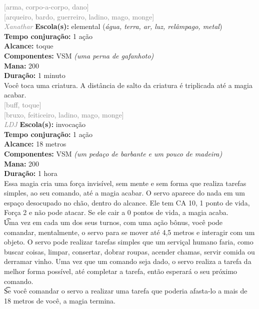 \documentclass{RPG_Adventure}[2021/10/20]
\begin{document}
{\scriptsize \textcolor{gray}{[arma, corpo-a-corpo, dano]\\}}
{\scriptsize \textcolor{gray}{[arqueiro, bardo, guerreiro, ladino, mago, monge]\\}}
{\tiny \textcolor{gray}{\textit{Xanathar}}}\jump{}
{\small \t \textbf{Escola(s):} elemental (\textit{água, terra, ar, luz, relâmpago, metal})\\\t \textbf{Tempo conjuração:} 1 ação\\\t \textbf{Alcance:} toque\\\t \textbf{Componentes:} VSM \textit{(uma perna de gafanhoto)}\\\t \textbf{Mana:} 200\\\t \textbf{Duração:} 1 minuto\\}
{\normalsize Você toca uma criatura. A distância de salto da criatura é triplicada até a magia acabar.\\}
{\scriptsize \textcolor{gray}{[buff, toque]\\}}
{\scriptsize \textcolor{gray}{[bruxo, feiticeiro, ladino, mago, monge]\\}}
{\tiny \textcolor{gray}{\textit{LDJ}}}\jump{}
{\small \t \textbf{Escola(s):} invocação\\\t \textbf{Tempo conjuração:} 1 ação\\\t \textbf{Alcance:} 18 metros\\\t \textbf{Componentes:} VSM \textit{(um pedaço de barbante e um pouco de madeira)}\\\t \textbf{Mana:} 200\\\t \textbf{Duração:} 1 hora\\}
{\normalsize Essa magia cria uma força invisível, sem mente e sem forma que realiza tarefas simples, ao seu comando, até a magia acabar. O servo aparece do nada em um espaço desocupado no chão, dentro do alcance. Ele tem CA 10, 1 ponto de vida, Força 2 e não pode atacar. Se ele cair a 0 pontos de vida, a magia acaba.\\\t Uma vez em cada um dos seus turnos, com uma ação bônus, você pode comandar, mentalmente, o servo para se mover até 4,5 metros e interagir com um objeto. O servo pode realizar tarefas simples que um serviçal humano faria, como buscar coisas, limpar, consertar, dobrar roupas, acender chamas, servir comida ou derramar vinho. Uma vez que um comando seja dado, o servo realiza a tarefa da melhor forma possível, até completar a tarefa, então esperará o seu próximo comando.\\\t Se você comandar o servo a realizar uma tarefa que poderia afasta-lo a mais de 18 metros de você, a magia termina.\\}
\end{document}
